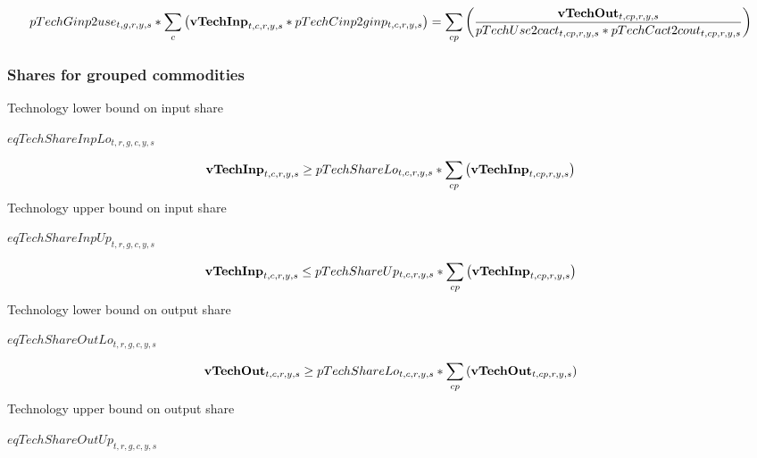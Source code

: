 \documentclass{article}
\begin{document}
\begin{dmath} 
pTechGinp2use_{t,g,r,y,s}*\sum_{c}{\left({\bf vTechInp}_{t,c,r,y,s}*pTechCinp2ginp_{t,c,r,y,s}\right)}  =  \sum_{cp}{\left(\frac{{\bf vTechOut}_{t,cp,r,y,s}}{pTechUse2cact_{t,cp,r,y,s}*pTechCact2cout_{t,cp,r,y,s}}\right)}
\end{dmath} 
\subsubsection*{Shares for grouped commodities}
Technology lower bound on input share







$eqTechShareInpLo_{t,r,g,c,y,s}$





\begin{dmath} 
{\bf vTechInp}_{t,c,r,y,s}  \ge  pTechShareLo_{t,c,r,y,s}*\sum_{cp}{\left({\bf vTechInp}_{t,cp,r,y,s}\right)}
\end{dmath} 
Technology upper bound on input share







$eqTechShareInpUp_{t,r,g,c,y,s}$





\begin{dmath} 
{\bf vTechInp}_{t,c,r,y,s}  \le  pTechShareUp_{t,c,r,y,s}*\sum_{cp}{\left({\bf vTechInp}_{t,cp,r,y,s}\right)}
\end{dmath} 
Technology lower bound on output share







$eqTechShareOutLo_{t,r,g,c,y,s}$





\begin{dmath} 
{\bf vTechOut}_{t,c,r,y,s}  \ge  pTechShareLo_{t,c,r,y,s}*\sum_{cp}{\left({\bf vTechOut}_{t,cp,r,y,s}\right)}
\end{dmath} 
Technology upper bound on output share







$eqTechShareOutUp_{t,r,g,c,y,s}$
\end{document}

